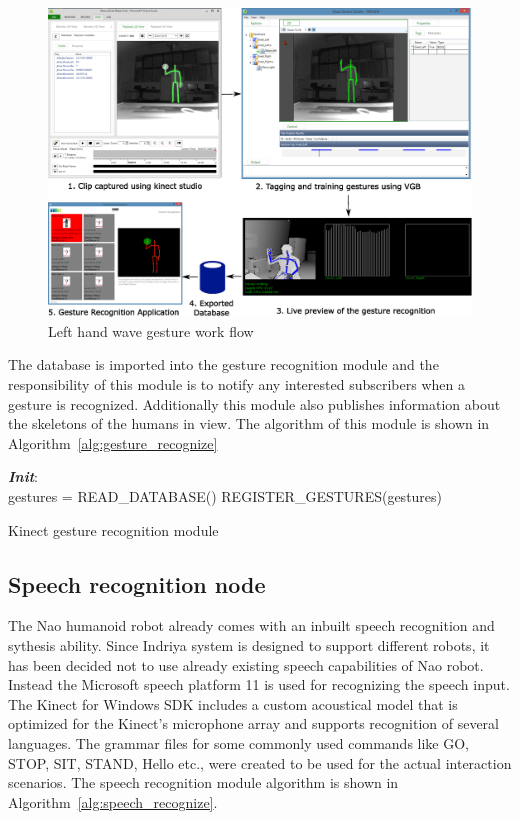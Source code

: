 \begin{figure}[H]
\centering
\includegraphics[width=\textwidth]{assets/gesture_recog_flow.eps}
\caption[Left hand wave gesture work flow]{Left hand wave gesture work flow}
\label{fig:gesture_waveleft}
\end{figure}
The database is imported into the gesture recognition module and the responsibility of this module is to notify any interested subscribers when a gesture is recognized. Additionally this module also publishes information about the skeletons of the humans in view. The algorithm of this module is shown in Algorithm~\ref{alg:gesture_recognize}

\begin{algorithm}[H]
 \textbf{\emph{Init}}:\\
 \quad gestures = READ\_DATABASE()\;
 \quad REGISTER\_GESTURES(gestures)\;
 \caption{Kinect gesture recognition module}
 \label{alg:gesture_recognize}
\end{algorithm}
\subsection{Speech recognition node}
The Nao humanoid robot already comes with an inbuilt speech recognition and sythesis ability. Since Indriya system is designed to support different robots, it has been decided not to use already existing speech capabilities of Nao robot. Instead the Microsoft speech platform 11 is used for recognizing the speech input. The Kinect for Windows SDK includes a custom acoustical model that is optimized for the Kinect's microphone array and supports recognition of several languages. The grammar files for some commonly used commands like GO, STOP, SIT, STAND, Hello etc., were created to be used for the actual interaction scenarios. The speech recognition module algorithm is shown in Algorithm~\ref{alg:speech_recognize}.

